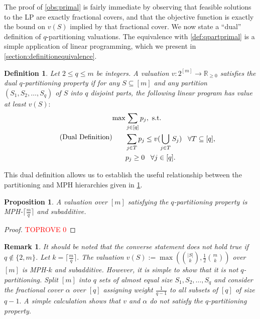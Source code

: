 \documentclass[11pt]{article}\usepackage{amsfonts}
\newtheorem{definition}[theorem]{Definition}
\newtheorem{remark}[theorem]{Remark}
\newtheorem{proposition}[theorem]{Proposition}
\numberwithin{theorem}{subsection}
\begin{document}
The proof of \cref{obs:primal} is fairly immediate by observing that feasible solutions to the LP are exactly fractional covers, and that the objective function is exactly the bound on $v(S)$ implied by that fractional cover. We now state a ``dual'' definition of $q$-partitioning valuations. The equivalence with \cref{def:qpartprimal} is a simple application of linear programming, which we present in \cref{section:definitionequivalence}.

\begin{definition}
\label{def:qpartdual}
Let $2\le q \le m$ be integers. A valuation $v:2^{[m]}\longrightarrow \mathbb{R}_{\ge 0}$ satisfies the dual $q$-partitioning property if for any $S\subseteq [m]$ and any partition $(S_1, S_2, \ldots, S_q)$ of $S$ into $q$ disjoint parts, the following linear program has value at least $v(S):$
\begin{equation}
\tag{\text{Dual Definition}}
\label{eq:qpartdualLP}
    \begin{split}
        \max &\sum_{j \in [q]} p_j, \text{ s.t.}\\
        & \sum_{j \in T} p_j\le v(\bigcup_{j \in T} S_j) \; \; \; \forall T\subseteq [q],\\
        &p_j\ge 0 \; \; \; \forall j\in [q].
    \end{split}
\end{equation}
\end{definition}

\noindent
This dual definition allows us to establish the useful relationship between the partitioning and MPH hierarchies given in \cref{lem:qpartandmphk}.


\begin{proposition}
\label{lem:qpartandmphk}
A valuation over $[m]$ satisfying the $q$-partitioning property is MPH-$\lceil \frac{m}{q}\rceil$ and subadditive.\end{proposition}

\begin{proof}\textcolor{red}{TOPROVE 0}\end{proof}

\begin{remark}
\normalfont
It should be noted that the converse statement does not hold true if $q\not \in \{2,m\}$. Let $k = \lceil \frac{m}{q}\rceil.$ The valuation $v(S):= \max\left( \binom{|S|}{k}, \frac{1}{2}\binom{m}{k}\right)$ over $[m]$ is MPH-$k$ and subadditive. However, it is simple to show that it is not $q$-partitioning. Split $[m]$ into $q$ sets of almost equal size $S_1, S_2, \ldots, S_q$ and consider the fractional cover $\alpha$ over $[q]$ assigning weight $\frac{1}{q-1}$ to all subsets of $[q]$ of size $q-1.$ A simple calculation shows that $v$ and $\alpha$ do not satisfy the $q$-partitioning property.
\end{remark}
\end{document}
